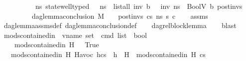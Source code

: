 \begin{isabellebody}
\ \ \ \ \ \ \ \ \ \ {\isachardoublequoteopen}{\isasymAnd}ns{\isachardot}{\kern0pt}\ state{\isacharunderscore}{\kern0pt}well{\isacharunderscore}{\kern0pt}typed\ {\isasymLambda}\ {\isasymOmega}\ ns\ {\isasymLongrightarrow}\ list{\isacharunderscore}{\kern0pt}all\ {\isacharparenleft}{\kern0pt}{\isasymlambda}inv{\isachardot}{\kern0pt}\ {\isasymexists}b{\isachardot}{\kern0pt}\ {\isasymLambda}{\isacharcomma}{\kern0pt}{\isasymGamma}{\isacharcomma}{\kern0pt}{\isasymOmega}\ {\isasymturnstile}\ {\isasymlangle}inv{\isacharcomma}{\kern0pt}\ ns{\isasymrangle}\ {\isasymDown}\ BoolV\ b{\isacharparenright}{\kern0pt}\ post{\isacharunderscore}{\kern0pt}invs{\isachardoublequoteclose}\isanewline
\ \ \ \ \ \ \ \ \ {\isachardoublequoteopen}dag{\isacharunderscore}{\kern0pt}lemma{\isacharunderscore}{\kern0pt}conclusion\ M\ {\isasymLambda}\ {\isasymGamma}\ {\isasymOmega}\ post{\isacharunderscore}{\kern0pt}invs\ cs{}\ ns{}\ s{\isacharprime}{\kern0pt}\ c{\isachardoublequoteclose}\isanewline
%
\isadelimproof
\ \ %
\endisadelimproof
%
\isatagproof
{}\isamarkupfalse%
\ assms\isanewline
\ \ \isamarkupfalse%
\ dag{\isacharunderscore}{\kern0pt}lemma{\isacharunderscore}{\kern0pt}assms{\isacharunderscore}{\kern0pt}def\ dag{\isacharunderscore}{\kern0pt}lemma{\isacharunderscore}{\kern0pt}conclusion{\isacharunderscore}{\kern0pt}def\isanewline
\ \ \isamarkupfalse%
\ dag{\isacharunderscore}{\kern0pt}rel{\isacharunderscore}{\kern0pt}block{\isacharunderscore}{\kern0pt}lemma\isanewline
\ \ \isamarkupfalse%
\ blast%
\endisatagproof
{\isafoldproof}%
%
\isadelimproof
\isanewline
%
\endisadelimproof
\isanewline
{}\isamarkupfalse%
%
\isadelimdocument
%
\endisadelimdocument
%
\isatagdocument
%
\isamarkuptrue%
%
\endisatagdocument
{\isafolddocument}%
%
\isadelimdocument
%
\endisadelimdocument
{}\isamarkupfalse%
\ mods{\isacharunderscore}{\kern0pt}contained{\isacharunderscore}{\kern0pt}in\ {\isacharcolon}{\kern0pt}{\isacharcolon}{\kern0pt}\ {\isachardoublequoteopen}vname\ set\ {\isasymRightarrow}\ cmd\ list\ {\isasymRightarrow}\ bool{\isachardoublequoteclose}\isanewline
\ \ \isanewline
\ \ \ \ {\isachardoublequoteopen}mods{\isacharunderscore}{\kern0pt}contained{\isacharunderscore}{\kern0pt}in\ H\ {\isacharbrackleft}{\kern0pt}{\isacharbrackright}{\kern0pt}\ {\isacharequal}{\kern0pt}\ True{\isachardoublequoteclose}\isanewline
\ \ {\isacharbar}{\kern0pt}\ {\isachardoublequoteopen}mods{\isacharunderscore}{\kern0pt}contained{\isacharunderscore}{\kern0pt}in\ H\ {\isacharparenleft}{\kern0pt}{\isacharparenleft}{\kern0pt}Havoc\ h{\isacharparenright}{\kern0pt}{\isacharhash}{\kern0pt}cs{\isacharparenright}{\kern0pt}\ {\isacharequal}{\kern0pt}\ {\isacharparenleft}{\kern0pt}{\isacharparenleft}{\kern0pt}h\ {\isasymin}\ H{\isacharparenright}{\kern0pt}\ {\isasymand}\ mods{\isacharunderscore}{\kern0pt}contained{\isacharunderscore}{\kern0pt}in\ H\ cs{\isacharparenright}{\kern0pt}{\isachardoublequoteclose}\isanewline

\end{isabellebody}
